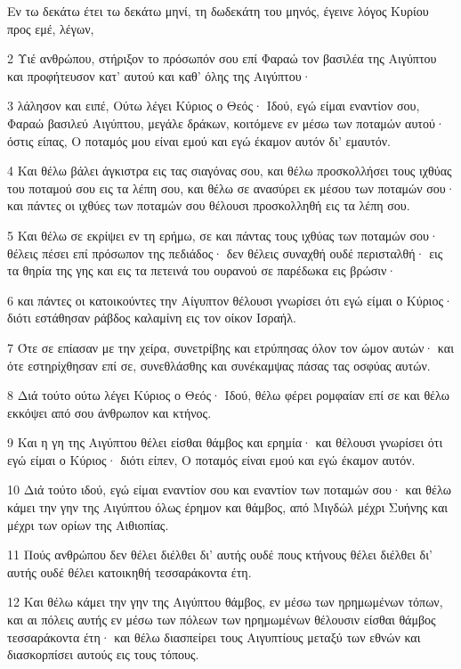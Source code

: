\par Εν τω δεκάτω έτει τω δεκάτω μηνί, τη δωδεκάτη του μηνός, έγεινε λόγος Κυρίου προς εμέ, λέγων,
\par 2 Υιέ ανθρώπου, στήριξον το πρόσωπόν σου επί Φαραώ τον βασιλέα της Αιγύπτου και προφήτευσον κατ' αυτού και καθ' όλης της Αιγύπτου·
\par 3 λάλησον και ειπέ, Ούτω λέγει Κύριος ο Θεός· Ιδού, εγώ είμαι εναντίον σου, Φαραώ βασιλεύ Αιγύπτου, μεγάλε δράκων, κοιτόμενε εν μέσω των ποταμών αυτού· όστις είπας, Ο ποταμός μου είναι εμού και εγώ έκαμον αυτόν δι' εμαυτόν.
\par 4 Και θέλω βάλει άγκιστρα εις τας σιαγόνας σου, και θέλω προσκολλήσει τους ιχθύας του ποταμού σου εις τα λέπη σου, και θέλω σε ανασύρει εκ μέσου των ποταμών σου· και πάντες οι ιχθύες των ποταμών σου θέλουσι προσκολληθή εις τα λέπη σου.
\par 5 Και θέλω σε εκρίψει εν τη ερήμω, σε και πάντας τους ιχθύας των ποταμών σου· θέλεις πέσει επί πρόσωπον της πεδιάδος· δεν θέλεις συναχθή ουδέ περισταλθή· εις τα θηρία της γης και εις τα πετεινά του ουρανού σε παρέδωκα εις βρώσιν·
\par 6 και πάντες οι κατοικούντες την Αίγυπτον θέλουσι γνωρίσει ότι εγώ είμαι ο Κύριος· διότι εστάθησαν ράβδος καλαμίνη εις τον οίκον Ισραήλ.
\par 7 Ότε σε επίασαν με την χείρα, συνετρίβης και ετρύπησας όλον τον ώμον αυτών· και ότε εστηρίχθησαν επί σε, συνεθλάσθης και συνέκαμψας πάσας τας οσφύας αυτών.
\par 8 Διά τούτο ούτω λέγει Κύριος ο Θεός· Ιδού, θέλω φέρει ρομφαίαν επί σε και θέλω εκκόψει από σου άνθρωπον και κτήνος.
\par 9 Και η γη της Αιγύπτου θέλει είσθαι θάμβος και ερημία· και θέλουσι γνωρίσει ότι εγώ είμαι ο Κύριος· διότι είπεν, Ο ποταμός είναι εμού και εγώ έκαμον αυτόν.
\par 10 Διά τούτο ιδού, εγώ είμαι εναντίον σου και εναντίον των ποταμών σου· και θέλω κάμει την γην της Αιγύπτου όλως έρημον και θάμβος, από Μιγδώλ μέχρι Συήνης και μέχρι των ορίων της Αιθιοπίας.
\par 11 Πούς ανθρώπου δεν θέλει διέλθει δι' αυτής ουδέ πους κτήνους θέλει διέλθει δι' αυτής ουδέ θέλει κατοικηθή τεσσαράκοντα έτη.
\par 12 Και θέλω κάμει την γην της Αιγύπτου θάμβος, εν μέσω των ηρημωμένων τόπων, και αι πόλεις αυτής εν μέσω των πόλεων των ηρημωμένων θέλουσιν είσθαι θάμβος τεσσαράκοντα έτη· και θέλω διασπείρει τους Αιγυπτίους μεταξύ των εθνών και διασκορπίσει αυτούς εις τους τόπους.

